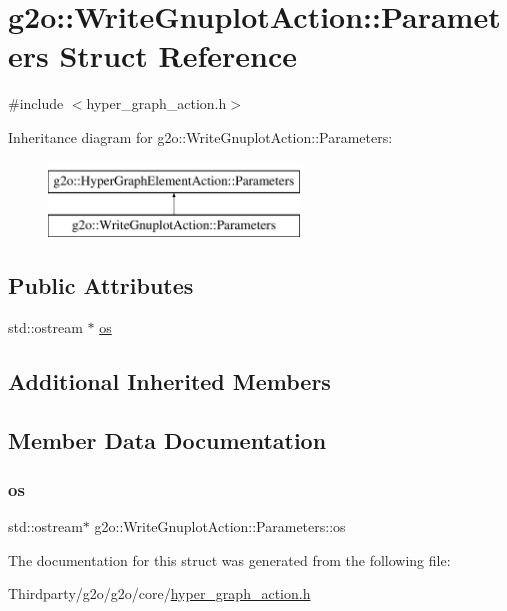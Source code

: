 \hypertarget{structg2o_1_1_write_gnuplot_action_1_1_parameters}{}\section{g2o\+:\+:Write\+Gnuplot\+Action\+:\+:Parameters Struct Reference}
\label{structg2o_1_1_write_gnuplot_action_1_1_parameters}


{\ttfamily \#include $<$hyper\+\_\+graph\+\_\+action.\+h$>$}

Inheritance diagram for g2o\+:\+:Write\+Gnuplot\+Action\+:\+:Parameters\+:\begin{figure}[H]
\begin{center}
\leavevmode
\includegraphics[height=2.000000cm]{structg2o_1_1_write_gnuplot_action_1_1_parameters}
\end{center}
\end{figure}
\subsection*{Public Attributes}
\begin{DoxyCompactItemize}
\item 
std\+::ostream $\ast$ \mbox{\hyperlink{structg2o_1_1_write_gnuplot_action_1_1_parameters_a8e25b8cffdc008929a939cf9080c5902}{os}}
\end{DoxyCompactItemize}
\subsection*{Additional Inherited Members}


\subsection{Member Data Documentation}
\mbox{\label{structg2o_1_1_write_gnuplot_action_1_1_parameters_a8e25b8cffdc008929a939cf9080c5902}} 
\subsubsection{\texorpdfstring{os}{os}}
{\footnotesize\ttfamily std\+::ostream$\ast$ g2o\+::\+Write\+Gnuplot\+Action\+::\+Parameters\+::os}



The documentation for this struct was generated from the following file\+:\begin{DoxyCompactItemize}
\item 
Thirdparty/g2o/g2o/core/\mbox{\hyperlink{hyper__graph__action_8h}{hyper\+\_\+graph\+\_\+action.\+h}}\end{DoxyCompactItemize}
